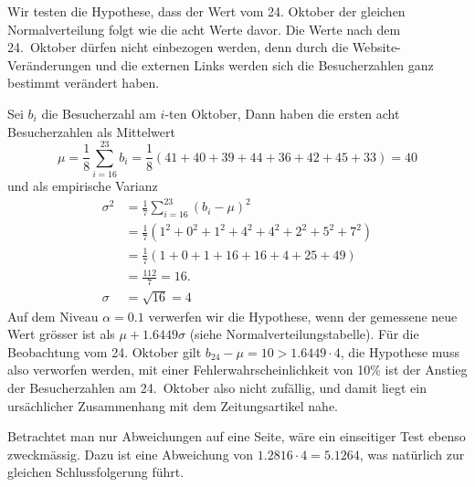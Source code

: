 \begin{loesung}
Wir testen die Hypothese, dass der Wert vom 24. Oktober der gleichen
Normalverteilung folgt wie die acht Werte davor. Die Werte nach
dem 24.~Oktober dürfen nicht einbezogen werden, denn durch die
Website-Veränderungen und die externen Links werden sich die
Besucherzahlen ganz bestimmt verändert haben.

Sei $b_i$ die Besucherzahl am $i$-ten Oktober,
Dann haben die ersten acht Besucherzahlen als Mittelwert
$$\mu=\frac18\sum_{i=16}^{23}b_i=\frac18(41+40+39+44+36+42+45+33)=40$$
und als empirische Varianz
\begin{align*}
\sigma^2&=\frac17\sum_{i=16}^{23}(b_i-\mu)^2\\
&=\frac17(1^2+0^2+1^2+4^2+4^2+2^2+5^2+7^2)\\
&=\frac17(1 + 0 + 1 + 16 + 16 + 4 + 25 + 49)\\
&=\frac{112}{7}=16.\\
\sigma&=\sqrt{16}=4
\end{align*}
Auf dem Niveau $\alpha=0.1$ verwerfen wir die Hypothese, wenn der gemessene
neue Wert grösser ist als $\mu + 1.6449\sigma$
(siehe Normalverteilungstabelle). Für die Beobachtung
vom 24. Oktober gilt $b_{24}-\mu=10 > 1.6449\cdot 4$, die Hypothese
muss also verworfen werden, mit einer Fehlerwahrscheinlichkeit von 10\%
ist der Anstieg der Besucherzahlen am 24.~Oktober also nicht zufällig,
und damit liegt ein ursächlicher Zusammenhang mit dem Zeitungsartikel nahe.

Betrachtet man nur Abweichungen auf eine Seite, wäre ein einseitiger Test
ebenso zweckmässig. Dazu ist eine Abweichung von $1.2816\cdot 4=5.1264$,
was natürlich zur gleichen Schlussfolgerung führt.
\end{loesung}

